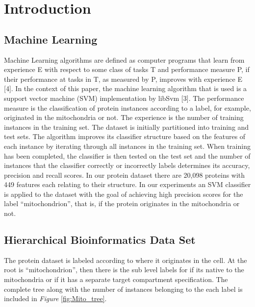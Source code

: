 \documentclass[ms]{nuthesis}
\begin{document}

\tableofcontents

\mainmatter

\chapter{Introduction}\label{chap:aenied}
\section{Machine Learning}
\par Machine Learning algorithms are defined as computer programs that learn from experience E
with respect to some class of tasks T and performance measure P, if their performance at
tasks in T, as measured by P, improves with experience E [4]. In the context of this paper,
the machine learning algorithm that is used is a support vector machine (SVM) implementation
by libSvm [3]. The performance measure is the classification of protein instances according to a
label, for example, originated in the mitochondria or not.  The experience is the number of
training instances in the training set. The dataset is initially partitioned into training
and test sets. The algorithm improves its classifier structure based on the features of
each instance by iterating through all instances in the training set. When training has
been completed, the classifier is then tested on the test set and the number of instances
that the classifier correctly or incorrectly labels determines its accuracy, precision
and recall scores. In our protein dataset there are 20,098 proteins with 449 features each
relating to their structure. In our experiments an SVM classifier is applied to the dataset
with the goal of achieving high precision scores for the label “mitochondrion”, that is,
if the protein originates in the mitochondria or not.


\section{Hierarchical Bioinformatics Data Set}
\par The protein dataset is labeled according to where it originates in the cell.
At the root is “mitochondrion”, then there is the sub level labels for if its native
to the mitochondria or if it has a separate target compartment specification. The complete
tree along with the number of instances belonging to the each label is included in \textit{Figure} \ref{fig:Mito_tree}.
\end{document}

